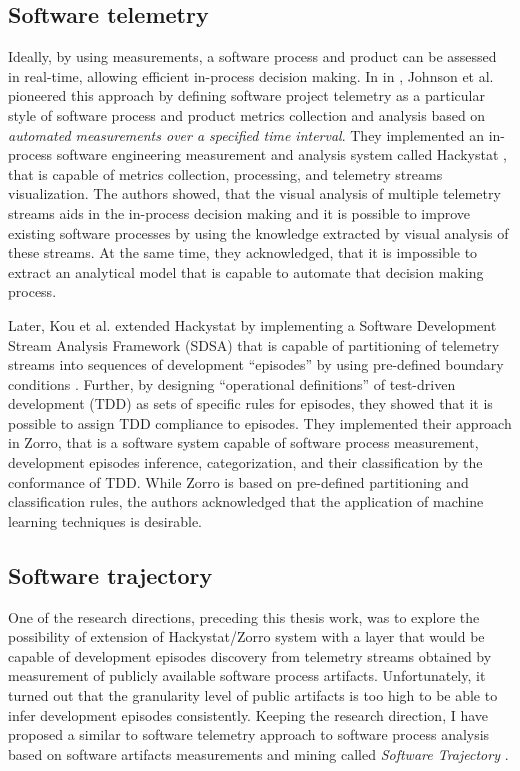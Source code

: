 \subsection{Software telemetry}\label{section_software_telemetry}
Ideally, by using measurements, a software process and product can be assessed in real-time, allowing efficient 
in-process decision making.
In in \cite{citeulike:557296}, Johnson et al. pioneered this approach by defining software project telemetry as a 
particular style of software process and product metrics collection and analysis based on 
\textit{automated measurements over a specified time interval}. 
They implemented an in-process software engineering measurement and analysis system called Hackystat 
\cite{citeulike:12929227}, that is capable of metrics collection, processing, and telemetry streams visualization. 
The authors showed, that the visual analysis of multiple telemetry streams aids in the in-process decision making 
and it is possible to improve existing software processes by using the knowledge extracted by visual 
analysis of these streams. At the same time, they acknowledged, that it is impossible to extract an analytical model 
that is capable to automate that decision making process.

Later, Kou et al. extended Hackystat by implementing a Software Development Stream Analysis Framework (SDSA) 
that is capable of partitioning of telemetry streams into sequences of development ``episodes'' by using pre-defined 
boundary conditions \cite{citeulike:6180831} \cite{citeulike:11538873}.
Further, by designing ``operational definitions'' of test-driven development (TDD) as sets of specific rules for 
episodes, they showed that it is possible to assign TDD compliance to episodes.
They implemented their approach in Zorro, that is a software system capable of software process measurement, 
development episodes inference, categorization, and their classification by the conformance of TDD. While Zorro is 
based on pre-defined partitioning and classification rules, the authors acknowledged that the application of machine 
learning techniques is desirable.

\subsection{Software trajectory}
One of the research directions, preceding this thesis work, was to explore the possibility of extension of Hackystat/Zorro
system with a layer that would be capable of development episodes discovery from telemetry streams obtained 
by measurement of publicly available software process artifacts. 
Unfortunately, it turned out that the granularity level of public artifacts is too high to be able to infer development 
episodes consistently.
Keeping the research direction, I have proposed a similar to software telemetry approach to software process analysis 
based on software artifacts measurements and mining called \textit{Software Trajectory} \cite{csdl2-10-09}. 


